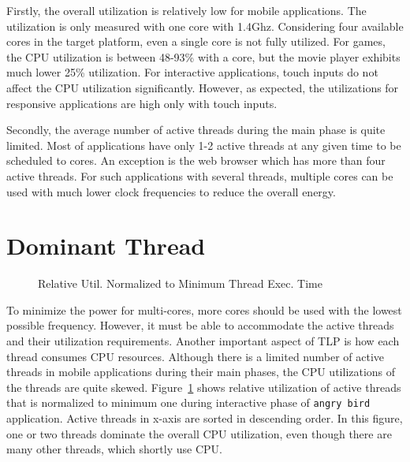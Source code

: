 Firstly, the overall utilization is relatively low for mobile applications. The utilization is
only measured with one core with 1.4Ghz. Considering four available cores in the target platform,
even a single core is not fully utilized. For games, the CPU utilization is between 48-93\%
with a core, but the movie player exhibits much lower 25\% utilization. For interactive
applications, touch inputs do not affect the CPU utilization significantly. However, as expected,
the utilizations for responsive applications are high only with touch inputs. 

Secondly, the average number of active threads during the main phase is quite limited. Most
of applications have only 1-2 active threads at any given time to be scheduled to cores. 
An exception is the web browser which has more than four active threads. For such applications
with several threads, multiple cores can be used with much lower clock frequencies to reduce
the overall energy.

\section{Dominant Thread}



\begin{figure}[relative_util]
\begin{center}
\vspace{-0.2in}
\end{center}
\caption{Relative Util. Normalized to Minimum Thread Exec. Time}
\label{fig:relative_util}
\end{figure}



To minimize the power for multi-cores, more cores should be used with the lowest possible frequency.
However, it must be able to accommodate the active threads and their utilization requirements. 
Another important aspect of TLP is how each thread consumes CPU resources. Although there is 
a limited number of active threads in mobile applications during their main phases, the CPU utilizations
of the threads are quite skewed. 
Figure~\ref{fig:relative_util} shows  relative utilization of active threads that is normalized to minimum one during interactive phase of {\tt angry bird} application.
Active threads in x-axis are sorted in descending order.
In this figure, one or two threads dominate the overall CPU utilization, even though
there are many other threads, which shortly use CPU.

